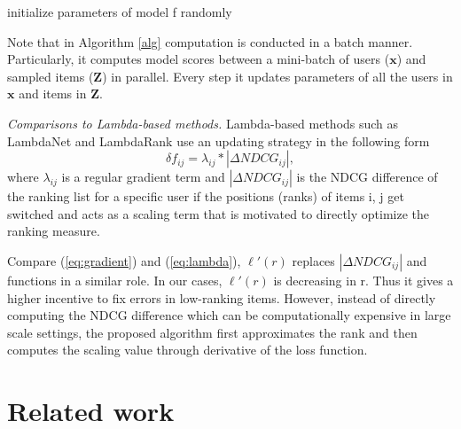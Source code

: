 \documentclass[letterpaper]{article} %
\begin{document}
\begin{algorithm}[!ht]
\SetAlgoLined
{}
 initialize parameters of model f randomly\;
 \caption{}
 \label{alg}
\end{algorithm}

Note that in Algorithm \ref{alg} computation is conducted in a batch manner. Particularly, it computes model scores between a mini-batch of users ($\textbf{x}$) and sampled items ($\textbf{Z}$) in parallel. Every step it updates parameters of all the users in $\textbf{x}$ and items in $\textbf{Z}$.

\textit{Comparisons to Lambda-based methods.} Lambda-based methods such as LambdaNet and LambdaRank use an updating strategy in the following form
\begin{equation}
\label{eq:lambda}
\delta f_{ij} = \lambda_{ij} * |\Delta NDCG_{ij}|,
\end{equation} 
where $\lambda_{ij}$ is a regular gradient term and $|\Delta NDCG_{ij}|$ is the NDCG difference of the ranking list for a specific user if the positions (ranks) of items i, j get switched and acts as a  scaling term that is motivated to directly optimize the ranking measure.

Compare (\ref{eq:gradient}) and (\ref{eq:lambda}), $\ell'(r)$ replaces $|\Delta NDCG_{ij}|$ and functions in a similar role. In our cases, $\ell'(r)$ is decreasing in r. Thus it gives a higher incentive to fix errors in low-ranking items. However, instead of directly computing the NDCG difference which can be computationally expensive in large scale settings, the proposed algorithm first approximates the rank and then computes the scaling value through derivative of the loss function.

\section{Related work}
\label{sec:related}
\end{document}
